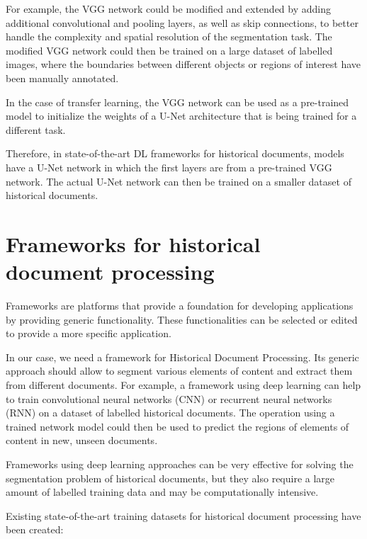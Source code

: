 \documentclass{polytech/polytech}
\numberwithin{figure}{chapter}
\begin{document}
For example, the VGG network could be modified and extended by adding additional convolutional and pooling layers, as well as skip connections, to better handle the complexity and spatial resolution of the segmentation task.
The modified VGG network could then be trained on a large dataset of labelled images, where the boundaries between different objects or regions of interest have been manually annotated.

In the case of transfer learning, the VGG network can be used as a pre-trained model to initialize the weights of a U-Net architecture that is being trained for a different task.

Therefore, in state-of-the-art DL frameworks for historical documents, models have a U-Net network in which the first layers are from a pre-trained VGG network.
The actual U-Net network can then be trained on a smaller dataset of historical documents.


\section{Frameworks for historical document processing}

Frameworks are platforms that provide a foundation for developing applications by providing generic functionality.
These functionalities can be selected or edited to provide a more specific application.

In our case, we need a framework for Historical Document Processing.
Its generic approach should allow to segment various elements of content and extract them from different documents.
For example, a framework using deep learning can help to train convolutional neural networks (CNN) or recurrent neural networks (RNN) on a dataset of labelled historical documents.
The operation using a trained network model could then be used to predict the regions of elements of content in new, unseen documents.

Frameworks using deep learning approaches can be very effective for solving the segmentation problem of historical documents, but they also require a large amount of labelled training data and may be computationally intensive.

Existing state-of-the-art training datasets for historical document processing have been created:

\label{datasets}
\end{document}
